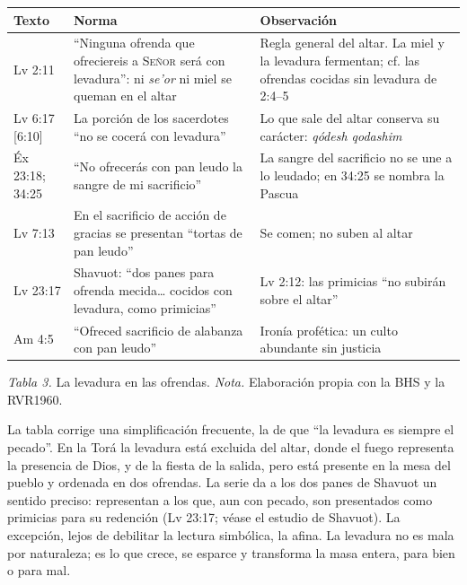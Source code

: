 \documentclass[11pt,letterpaper]{article}
\newcommand{\SENOR}{\textsc{Señor}}
\begin{document}
\begin{center}\begin{minipage}{\linewidth}\centering\small\renewcommand{\arraystretch}{1.2}
\begin{tabular}{@{}L{2.6cm}L{6.2cm}L{6.8cm}@{}}
\toprule
\textbf{Texto} & \textbf{Norma} & \textbf{Observación} \\ \midrule
Lv 2:11 & ``Ninguna ofrenda que ofreciereis a \SENOR{} será con levadura'': ni \emph{se'or} ni miel se queman en el altar & Regla general del altar. La miel y la levadura fermentan; cf. las ofrendas cocidas sin levadura de 2:4--5 \\
Lv 6:17 [6:10] & La porción de los sacerdotes ``no se cocerá con levadura'' & Lo que sale del altar conserva su carácter: \emph{qódesh qodashim} \\
Éx 23:18; 34:25 & ``No ofrecerás con pan leudo la sangre de mi sacrificio'' & La sangre del sacrificio no se une a lo leudado; en 34:25 se nombra la Pascua \\
Lv 7:13 & En el sacrificio de acción de gracias se presentan ``tortas de pan leudo'' & Se comen; no suben al altar \\
Lv 23:17 & Shavuot: ``dos panes para ofrenda mecida\ldots{} cocidos con levadura, como primicias'' & Lv 2:12: las primicias ``no subirán sobre el altar'' \\
Am 4:5 & ``Ofreced sacrificio de alabanza con pan leudo'' & Ironía profética: un culto abundante sin justicia \\
\bottomrule
\end{tabular}\par\nopagebreak
{\footnotesize\color{sepia}\textit{Tabla 3.} La levadura en las ofrendas. \textit{Nota.} Elaboración propia con la BHS y la RVR1960.}
\end{minipage}\end{center}

La tabla corrige una simplificación frecuente, la de que ``la levadura es siempre el pecado''. En la Torá la levadura está excluida del altar, donde el fuego representa la presencia de Dios, y de la fiesta de la salida, pero está presente en la mesa del pueblo y ordenada en dos ofrendas. La serie da a los dos panes de Shavuot un sentido preciso: representan a los que, aun con pecado, son presentados como primicias para su redención (Lv 23:17; véase el estudio de Shavuot). La excepción, lejos de debilitar la lectura simbólica, la afina. La levadura no es mala por naturaleza; es lo que crece, se esparce y transforma la masa entera, para bien o para mal.
\end{document}

